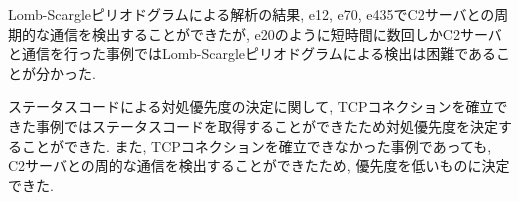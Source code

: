 \documentclass[twocolumn,9pt]{ltjsarticle}
\begin{document}
Lomb-Scargleピリオドグラムによる解析の結果, e12, e70, e435でC2サーバとの周期的な通信を検出することができたが, e20のように短時間に数回しかC2サーバと通信を行った事例ではLomb-Scargleピリオドグラムによる検出は困難であることが分かった. 

ステータスコードによる対処優先度の決定に関して, TCPコネクションを確立できた事例ではステータスコードを取得することができたため対処優先度を決定することができた. また, TCPコネクションを確立できなかった事例であっても, C2サーバとの周的な通信を検出することができたため, 優先度を低いものに決定できた. 



\end{document}
